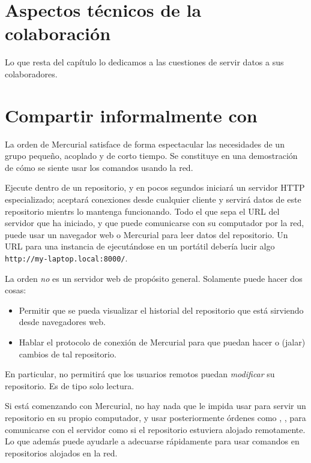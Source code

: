 \section{Aspectos técnicos de la colaboración}

Lo que resta del capítulo lo dedicamos a las cuestiones de servir
datos a sus colaboradores.

\section{Compartir informalmente con }
\label{sec:collab:serve}

La orden  de Mercurial satisface de forma espectacular
las necesidades de un grupo pequeño, acoplado y de corto
tiempo.  Se constituye en una demostración de cómo se siente usar los
comandos usando la red.

Ejecute  dentro de un repositorio, y en pocos segundos
iniciará un servidor HTTP especializado; aceptará conexiones desde
cualquier cliente y servirá datos de este repositorio mientrs lo
mantenga funcionando. Todo el que sepa el URL del servidor que ha
iniciado, y que puede comunicarse con su computador por la red, puede
usar un navegador web o Mercurial para leer datos del repositorio. Un
URL para una instancia de  ejecutándose en un portátil
debería lucir algo \Verb|http://my-laptop.local:8000/|.

La orden  \emph{no} es un servidor web de propósito
general. Solamente puede hacer dos cosas:
\begin{itemize}
\item Permitir que se pueda visualizar el historial del repositorio que
  está sirviendo desde navegadores web.
\item Hablar el protocolo de conexión de Mercurial para que puedan hacer
   o  (jalar) cambios de tal repositorio.
\end{itemize}
En particular,  no permitirá que los usuarios remotos
puedan \emph{modificar} su repositorio.  Es de tipo solo lectura.

Si está comenzando con Mercurial, no hay nada que le impida usar
 para servir un repositorio en su propio computador, y
usar posteriormente órdenes como , , para
comunicarse con el servidor como si el repositorio estuviera alojado
remotamente. Lo que además puede ayudarle a adecuarse rápidamente para
usar comandos en repositorios alojados en la red.

